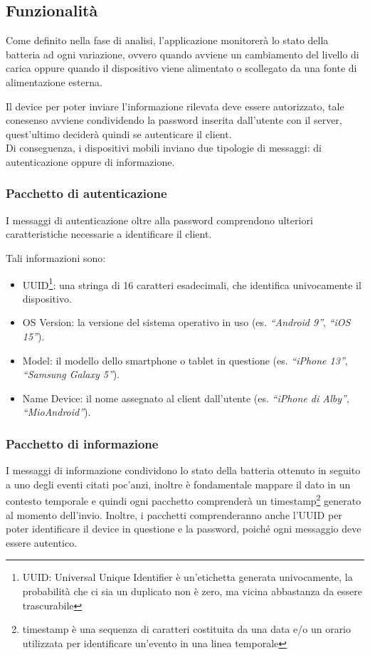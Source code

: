 \documentclass[target=bach]{thud}
\begin{document}
    \subsection{Funzionalità}

        Come definito nella fase di analisi, l'applicazione monitorerà lo stato della batteria ad ogni variazione, ovvero quando avviene un cambiamento del livello di carica oppure quando il dispositivo viene alimentato o scollegato da una fonte di alimentazione esterna.

        Il device per poter inviare l'informazione rilevata deve essere autorizzato, tale conesenso avviene condividendo la password inserita dall'utente con il server, quest'ultimo deciderà quindi se autenticare il client.\\
        Di conseguenza, i dispositivi mobili inviano due tipologie di messaggi: di autenticazione oppure di informazione.

    \subsubsection{Pacchetto di autenticazione}
        I messaggi di autenticazione oltre alla password comprendono ulteriori caratteristiche necessarie a identificare il client.

        Tali informazioni sono:
        \begin{itemize}
            \setlength{\itemsep}{1pt}
            \item UUID\footnote[1]{UUID: Universal Unique Identifier è un'etichetta generata univocamente, la probabilità che ci sia un duplicato non è zero, ma vicina abbastanza da essere trascurabile}: una stringa di 16 caratteri esadecimali, che identifica univocamente il dispositivo.
            \item OS Version: la versione del sistema operativo in uso (es. \textit{``Android 9''}, \textit{``iOS 15''}).
            \item Model: il modello dello smartphone o tablet in questione (es. \textit{``iPhone 13''}, \textit{``Samsung Galaxy 5''}).
            \item Name Device: il nome assegnato al client dall'utente (es. \textit{``iPhone di Alby''}, \textit{``MioAndroid''}).
        \end{itemize}

    \subsubsection{Pacchetto di informazione}
        I messaggi di informazione condividono lo stato della batteria ottenuto in seguito a uno degli eventi citati poc'anzi, inoltre è fondamentale mappare il dato in un contesto temporale e quindi ogni pacchetto comprenderà un timestamp\footnote[2]{timestamp è una sequenza di caratteri costituita da una data e/o un orario utilizzata per identificare un'evento in una linea temporale} generato al momento dell'invio.
        Inoltre, i pacchetti comprenderanno anche l'UUID per poter identificare il device in questione e la password, poiché ogni messaggio deve essere autentico.
\end{document}
